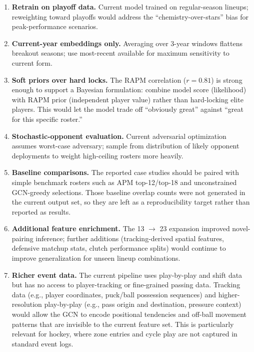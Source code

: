 \documentclass[11pt,letterpaper]{article}
\begin{document}
\begin{enumerate}[leftmargin=*]
  \item \textbf{Retrain on playoff data.} Current model trained on
    regular-season lineups; reweighting toward playoffs would address
    the ``chemistry-over-stars'' bias for peak-performance scenarios.
  \item \textbf{Current-year embeddings only.} Averaging over 3-year
    windows flattens breakout seasons; use most-recent available for
    maximum sensitivity to current form.
  \item \textbf{Soft priors over hard locks.} The RAPM correlation
    ($r = 0.81$) is strong enough to support a Bayesian formulation:
    combine model score (likelihood) with RAPM prior (independent
    player value) rather than hard-locking elite players. This would
    let the model trade off ``obviously great'' against ``great for
    this specific roster.''
  \item \textbf{Stochastic-opponent evaluation.} Current adversarial optimization
    assumes worst-case adversary; sample from distribution of likely
    opponent deployments to weight high-ceiling rosters more heavily.
  \item \textbf{Baseline comparisons.} The reported case studies should
    be paired with simple benchmark rosters such as APM top-12/top-18
    and unconstrained GCN-greedy selections. Those baseline overlap
    counts were not generated in the current output set, so they are
    left as a reproducibility target rather than reported as results.
  \item \textbf{Additional feature enrichment.} The 13 $\to$ 23
    expansion improved novel-pairing inference; further additions
    (tracking-derived spatial features, defensive matchup stats, clutch
    performance splits) would continue to improve generalization for
    unseen lineup combinations.
  \item \textbf{Richer event data.} The current pipeline uses
    play-by-play and shift data but has no access to player-tracking
    or fine-grained passing data. Tracking data (e.g., player
    coordinates, puck/ball possession sequences) and higher-resolution
    play-by-play (e.g., pass origin and destination, pressure context)
    would allow the GCN to encode positional tendencies and off-ball
    movement patterns that are invisible to the current feature set.
    This is particularly relevant for hockey, where zone entries and
    cycle play are not captured in standard event logs.
\end{enumerate}
\end{document}
